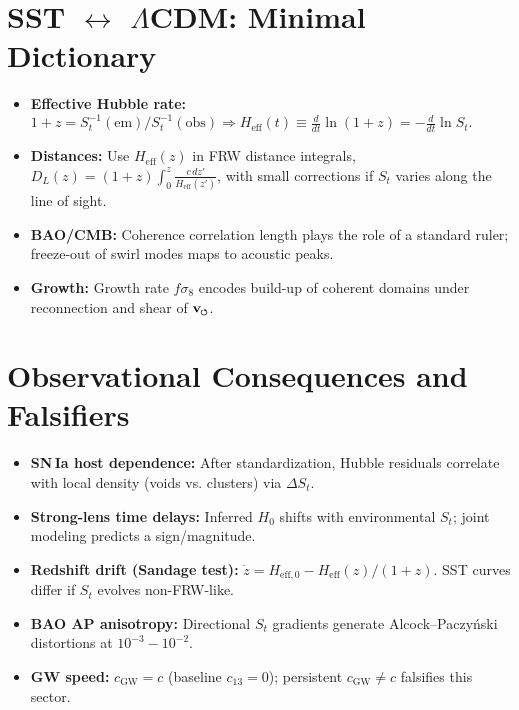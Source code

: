 \documentclass[10pt,reprint,aps,onecolumn,nofootinbib]{revtex4-2}
\newcommand{\swirlarrow}{%
    \mathchoice{\mkern-2mu\scriptstyle\boldsymbol{\circlearrowleft}}%
    {\mkern-2mu\scriptstyle\boldsymbol{\circlearrowleft}}%
    {\mkern-2mu\scriptscriptstyle\boldsymbol{\circlearrowleft}}%
    {\mkern-2mu\scriptscriptstyle\boldsymbol{\circlearrowleft}}%
}
\newcommand{\vswirl}{\mathbf{v}_{\swirlarrow}}
\begin{document}
\section*{SST \(\leftrightarrow\) \(\Lambda\)CDM: Minimal Dictionary}
\begin{itemize}
  \item \textbf{Effective Hubble rate:}
  \(
  1+z = S_t^{-1}(\mathrm{em})/S_t^{-1}(\mathrm{obs})
  \Rightarrow
  H_{\text{eff}}(t) \equiv \frac{d}{dt}\ln(1+z) = -\frac{d}{dt}\ln S_t.
  \)
  \item \textbf{Distances:} Use \(H_{\text{eff}}(z)\) in FRW distance integrals,
  \(D_L(z)=(1+z)\int_0^z \frac{c\,dz'}{H_{\text{eff}}(z')}\),
  with small corrections if \(S_t\) varies along the line of sight.
  \item \textbf{BAO/CMB:} Coherence correlation length plays the role of a standard ruler; freeze-out of swirl modes maps to acoustic peaks.
  \item \textbf{Growth:} Growth rate \(f\sigma_8\) encodes build-up of coherent domains under reconnection and shear of \(\vswirl\).
\end{itemize}

\section*{Observational Consequences and Falsifiers}
\begin{tcolorbox}[colback=white,colframe=black,title=Falsifiable predictions]
\begin{itemize}
  \item \textbf{SN\,Ia host dependence:} After standardization, Hubble residuals correlate with local density (voids vs. clusters) via \(\Delta S_t\).
  \item \textbf{Strong-lens time delays:} Inferred \(H_0\) shifts with environmental \(S_t\); joint modeling predicts a sign/magnitude.
  \item \textbf{Redshift drift (Sandage test):} \(\dot z=H_{\text{eff},0}-H_{\text{eff}}(z)/(1+z)\). SST curves differ if \(S_t\) evolves non-FRW-like.
  \item \textbf{BAO AP anisotropy:} Directional \(S_t\) gradients generate Alcock–Paczyński distortions at \(10^{-3}\!-\!10^{-2}\).
  \item \textbf{GW speed:} \(c_{\mathrm{GW}}=c\) (baseline \(c_{13}=0\)); persistent \(c_{\mathrm{GW}}\neq c\) falsifies this sector. %
\end{itemize}
\end{tcolorbox}
\end{document}

